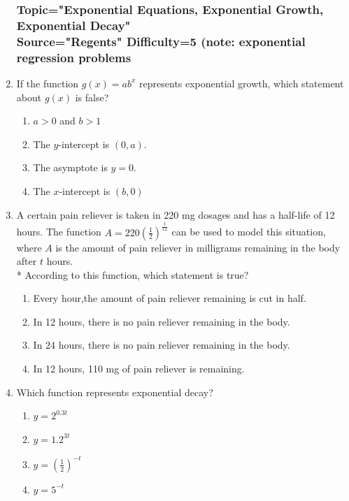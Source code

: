 \documentclass[12pt, oneside]{article}
\begin{document}
\begin{enumerate}
\subsubsection*{Topic="Exponential Equations, Exponential Growth, Exponential Decay"\\
Source="Regents" 
Difficulty=5 (note: exponential regression problems}

\item If the function $g(x) = ab^x$ represents exponential growth, which statement about $g(x)$ is false?
\begin{enumerate}
    \item $a > 0$ and $b>1$
    \item The $y$-intercept is $(0, a)$.
    \item The asymptote is $y=0$.
    \item The $x$-intercept is $(b,0)$
\end{enumerate} %

\item A certain pain reliever is taken in 220 mg dosages and has a half-life of 12 hours. The function $\displaystyle A = 220 \left( \frac{1}{2} \right) ^\frac{t}{12}$ can be used to model this situation, where $A$ is the amount of pain reliever in milligrams remaining in the body after $t$ hours.\\*
According to this function, which statement is true?
\begin{enumerate}
    \item Every hour,the amount of pain reliever remaining is cut in half. 
    \item In 12 hours, there is no pain reliever remaining in the body.
    \item In 24 hours, there is no pain reliever remaining in the body.
    \item In 12 hours, 110 mg of pain reliever is remaining.
\end{enumerate}

\item Which function represents exponential decay?
\begin{enumerate}
    \item $y=2^{0.3t}$
    \item $y=1.2^{3t}$
    \item $\displaystyle y=\left( \frac{1}{2}\right) ^{-t}$
    \item $y=5^{-t}$
\end{enumerate} %


\end{enumerate}
\end{document}
